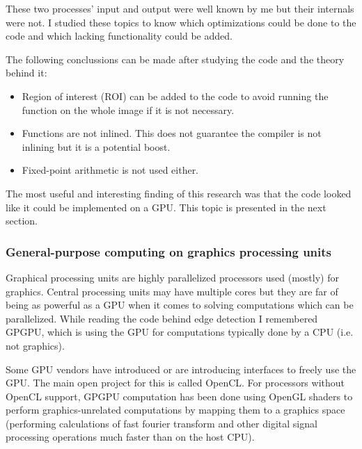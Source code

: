 These two processes' input and output were well known by me but their internals were not. I studied these topics to know which optimizations could be done to the code and which lacking functionality could be added.

The following conclussions can be made after studying the code and the theory behind it:
\begin{itemize}
	\item Region of interest (ROI) can be added to the code to avoid running the function on the whole image if it is not necessary.
	\item Functions are not inlined. This does not guarantee the compiler is not inlining but it is a potential boost.
	\item Fixed-point arithmetic is not used either.
\end{itemize}

The most useful and interesting finding of this research was that the code looked like it could be implemented on a GPU. This topic is presented in the next section.


\subsubsection{General-purpose computing on graphics processing units}

Graphical processing units are highly parallelized processors used (mostly) for graphics. Central processing units may have multiple cores but they are far of being as powerful as a GPU when it comes to solving computations which can be parallelized. While reading the code behind edge detection I remembered GPGPU, which is using the GPU for computations typically done by a CPU (i.e. not graphics). 

Some GPU vendors have introduced or are introducing interfaces to freely use the GPU. The main open project for this is called OpenCL. For processors without OpenCL support, GPGPU computation has been done using OpenGL shaders to perform graphics-unrelated computations by mapping them to a graphics space (performing calculations of fast fourier transform and other digital signal processing operations much faster than on the host CPU).

